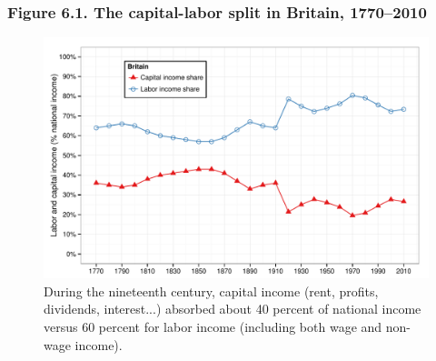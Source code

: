 \documentclass[t]{beamer}\usepackage[]{graphicx}\usepackage[]{color}
\newenvironment{knitrout}{}{} %
\begin{document}
\begin{frame}[label=Figure_6_1]
\frametitle{Figure 6.1. The capital-labor split in Britain, 1770--2010}
\begin{figure}[t]
\begin{minipage}[b]{\textwidth}
\centering
\begin{knitrout}\footnotesize
{}\color{fgcolor}

{\centering \includegraphics[width=1\linewidth]{figures/color/Figure_6_1} 

}



\end{knitrout}
\caption{During the nineteenth century, capital income (rent, profits, dividends, interest...) absorbed about 40 percent of national income versus 60 percent for labor income (including both wage and non-wage income).}
\end{minipage}
\end{figure}
\end{frame}
\end{document}
